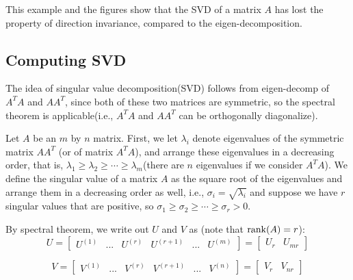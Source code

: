This example and the figures show that the SVD of a matrix $A$ has lost the property of direction invariance, compared to the eigen-decomposition.



\vspace{2cm}
\subsection{Computing SVD}
The idea of singular value decomposition(SVD) follows from eigen-decomp of $A^TA$ and $AA^T$, since both of these two matrices are symmetric, so the spectral theorem is applicable(i.e., $A^TA$ and $AA^T$ can be orthogonally diagonalize). 

Let $A$ be an $m$ by $n$ matrix. First, we let $\lambda_i$ denote eigenvalues of the symmetric matrix $A A^T$ (or of matrix $A^T A$), and arrange these eigenvalues in a decreasing order, that is, $\lambda_1\geq \lambda_2\geq \cdots \geq \lambda_m$(there are $n$ eigenvalues if we consider $A^TA$). We define the singular value of a matrix $A$ as the square root of the eigenvalues and arrange them in a decreasing order as well, i.e., $\sigma_i=\sqrt{\lambda_i}$ and suppose we have $r$ singular values that are positive, so $\sigma_1\geq \sigma_2\geq \cdots \geq \sigma_r>0$.


By spectral theorem, we write out $U$ and $V$ as (note that $\operatorname{rank}(A)=r$):
$$ U =   
\left[
\begin{matrix}
U^{(1)} & ... & U^{(r)} & U^{(r+1)} & ... & U^{(m)}
\end{matrix}
\right] =
\left[
\begin{matrix}
U_r & U_{mr}
\end{matrix}
\right]
$$

$$ V =   
\left[
\begin{matrix}
V^{(1)} & ... & V^{(r)} & V^{(r+1)} & ... & V^{(n)}
\end{matrix}
\right] =
\left[
\begin{matrix}
V_r & V_{nr}
\end{matrix}
\right]
$$

